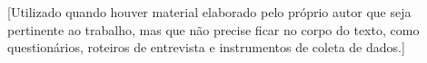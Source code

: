 \label{ap:A}

[Utilizado quando houver material elaborado pelo próprio autor que seja pertinente ao trabalho, mas que não precise ficar no corpo do texto, como questionários, roteiros de entrevista e instrumentos de coleta de dados.]
